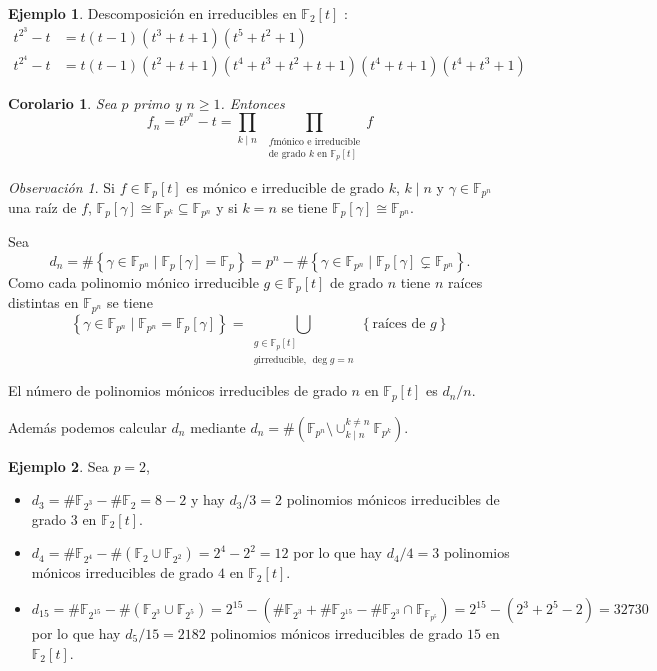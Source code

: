 \documentclass[10pt, spanish]{report}
\newtheorem{cor}{Corolario}[tma]
\theoremstyle{definition}
\newtheorem*{ej}{Ejemplo}
\theoremstyle{custom}
\theoremstyle{remark}
\newtheorem*{obs}{Observación}
\newcommand{\F}{\mathbb{F}}
\renewcommand{\geq}{\geqslant}
\begin{document}
\begin{ej}
    Descomposición en irreducibles en $\F_2[t]$ :
    \begin{align*}
        t^{2^3}-t&=t(t-1)(t^3+t+1)(t^5+t^2+1)\\
        t^{2^4}-t&=t(t-1)(t^2+t+1)(t^4+t^3+t^2+t+1)(t^4+t+1)(t^4+t^3+1)
    \end{align*}
\end{ej}

\begin{cor}
    Sea $p$ primo y $n\geq1$. Entonces \[f_n=t^{p^n}-t=\prod_{k\mid n}\
        \prod_{\substack{f  \text{mónico e irreducible}\\\text{de grado } k
                \text{ en }\F_p[t]}}f\]
\end{cor}

\begin{obs}
    Si $f\in\F_p[t]$ es mónico e irreducible de grado $k$, $k\mid n$ y $\gamma
    \in\F_{p^n}$ una raíz de $f$, $\F_p[\gamma]\cong \F_{p^k}\subseteq\F_{p^n}$
    y si $k=n$ se tiene $\F_p[\gamma]\cong\F_{p^n}$.

    Sea \[d_n=\#\left\{\gamma\in\F_{p^n}\mid\F_p[\gamma]=\F_p\right\}=p^n-
    \#\left\{ \gamma\in\F_{p^n}\mid \F_p[\gamma]\subsetneq \F_{p^n}\right\}.\]
    Como cada polinomio mónico irreducible $g\in\F_p[t]$ de grado $n$ tiene $n$
    raíces distintas en $\F_{p^n}$ se tiene
    \[ \left\{ \gamma\in\F_{p^n} \mid \F_{p^n} = \F_p[\gamma] \right\}
        = \bigcup_{\substack{g\in\F_p[t]\\g\text{
    irreducible},\,\deg{g}=n}}\left\{ \text{raíces de }g \right\}
    \]

    El número de polinomios mónicos irreducibles de grado $n$ en $\F_p[t]$ es $d_n /n$.

    Además podemos calcular $d_n$ mediante $d_n=\#(
    \F_{p^n}\setminus\cup_{k\mid n}^{k\neq n} \F_{p^k})$.
\end{obs}

\begin{ej}
    Sea $p=2$,
    \begin{itemize}
        \item
            $d_3=\#\F_{2^3} -\#\F_2=8-2$ y hay $d_3 /3 = 2$ polinomios mónicos
            irreducibles de grado $3$ en $\F_2[t]$.
        \item
            $d_4=\#\F_{2^4} -\#\left( \F_2\cup \F_{2^2} \right) = 2^4 -2^2 = 12$
            por lo que hay ${d_4}/{4} = 3$ polinomios mónicos irreducibles de grado
            $4$ en $\F_2[t]$.
        \item
            $d_{15}=\# \F_{2^15} - \# \left( \F_{2^3}\cup \F_{2^{5}} \right)
            =2^{15}-(\#\F_{2^3}+\#\F_{2^{15}}-\#\F_{2^3}\cap\F_{\F_{p^5}} )
            =2^{15}-(2^3+2^5-2)=32730$ por lo que hay $d_5 / 15 = 2182$
            polinomios mónicos irreducibles de grado $15$ en $\F_2[t]$.
    \end{itemize}
\end{ej}
\end{document}
